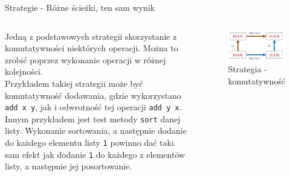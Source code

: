 \begin{frame}{Strategie - Różne ścieżki, ten sam wynik}
    \begin{columns}[t]
            Jedną z podstawowych strategii skorzystanie z komutatywności niektórych operacji. Można to zrobić poprzez wykonanie operacji w różnej kolejności.\\
            Przykładem takiej strategii może być komutatywność dodawania, gdzie wykorzystano \texttt{add x y}, jak i odwrotność tej operacji \texttt{add y x}.\\ 
            Innym przykładem jest test metody \texttt{sort} danej listy. 
            Wykonanie sortowania, a następnie dodanie do każdego elementu listy \texttt{1} powinno dać taki sam efekt jak dodanie \texttt{1} do każdego z elementów listy, a następnie jej posortowanie.
        \centering
        \begin{figure}
            \centering
            \includegraphics[width=1\textwidth]{images/property_list_sort1.png}
            \caption{Strategia - komutatywność}
            \label{fig:commutative_strategy_example}
        \end{figure}    
    \end{columns}
\end{frame}

